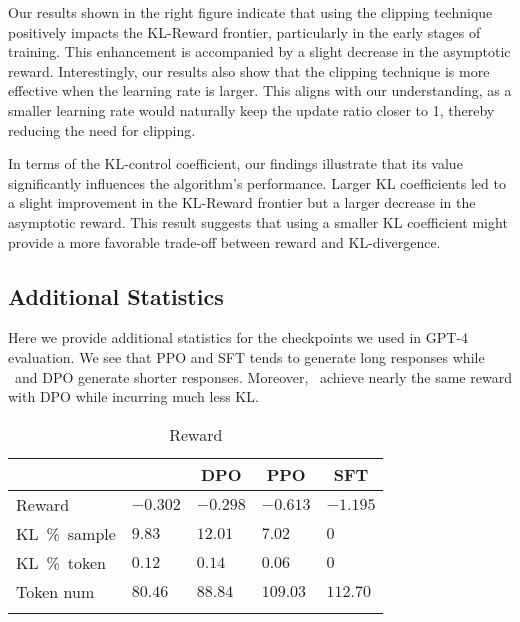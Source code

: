 \documentclass{article} %
\newcommand{\algn}{\text{P3O}}
\begin{document}
Our results shown in the right figure indicate that using the clipping technique positively impacts the KL-Reward frontier, particularly in the early stages of training. This enhancement is accompanied by a slight decrease in the asymptotic reward. Interestingly, our results also show that the clipping technique is more effective when the learning rate is larger. This aligns with our understanding, as a smaller learning rate would naturally keep the update ratio closer to 1, thereby reducing the need for clipping.

In terms of the KL-control coefficient, our findings illustrate that its value significantly influences the algorithm's performance. Larger KL coefficients led to a slight improvement in the KL-Reward frontier but a larger decrease in the asymptotic reward. This result suggests that using a smaller KL coefficient might provide a more favorable trade-off between reward and KL-divergence.
\subsection{Additional Statistics}
Here we provide additional statistics for the checkpoints we used in GPT-4 evaluation. We see that PPO and SFT tends to generate long responses while \algn\ and DPO generate shorter responses. Moreover, \algn\ achieve nearly the same reward with DPO while incurring much less KL.
\begin{table}[ht]
\caption{Reward}
\label{sample-table}
\begin{center}
\begin{tabular}{lllll}
\toprule
\multicolumn{1}{c}{} &\multicolumn{1}{c}{\bf \algn}  &\multicolumn{1}{c}{\bf DPO} &\multicolumn{1}{c}{\bf PPO} &\multicolumn{1}{c}{\bf SFT}\\
\midrule
Reward  &$-0.302$ & $-0.298$ & $-0.613$ & $-1.195$\\
KL\ \%\ sample    & $9.83$&$12.01$&$7.02$&  $0$\\
KL\ \%\ token    & $0.12$&$0.14$&$0.06$   &$0$\\
Token num     & $80.46$&$88.84$& $109.03$   &$112.70$\\
\bottomrule
\label{table:reward}
\end{tabular}
\end{center}
\end{table}
\end{document}
